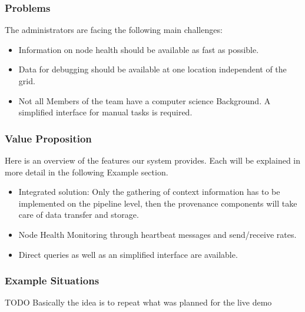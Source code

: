 \subsubsection{Problems}

The administrators are facing the following main challenges:

\begin{itemize}
  \item Information on node health should be available as fast as possible.
  \item Data for debugging should be available at one location independent of the grid.
  \item Not all Members of the team have a computer science Background. A simplified interface for manual tasks is required.
\end{itemize}


\subsubsection{Value Proposition}

Here is an overview of the features our system provides. Each will be explained in more detail in the following Example section.

\begin{itemize}
  \item Integrated solution: Only the gathering of context information has to be implemented on the pipeline level, then the provenance components will take care of data transfer and storage.
  \item Node Health Monitoring through heartbeat messages and send/receive rates.
  \item Direct queries as well as an simplified interface are available.
\end{itemize}

\subsubsection{Example Situations}
TODO
Basically the idea is to repeat what was planned for the live demo
